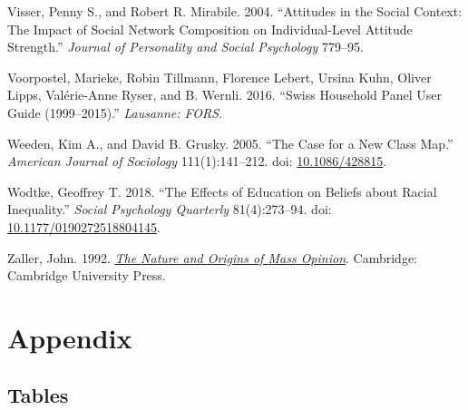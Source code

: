 \documentclass[
  11pt,
]{article}
\newlength{\cslhangindent}
\newlength{\cslentryspacingunit} %
\newenvironment{CSLReferences}[2] %
 {%
  \setlength{\parindent}{0pt}
  \ifodd #1
  \let\oldpar\par
  \def\par{\hangindent=\cslhangindent\oldpar}
  \fi
  \setlength{\parskip}{#2\cslentryspacingunit}
 }%
 {}
\begin{document}
\begin{CSLReferences}{1}{0}
\leavevmode{}%
Visser, Penny S., and Robert R. Mirabile. 2004. {``Attitudes in the
Social Context: {The} Impact of Social Network Composition on
Individual-Level Attitude Strength.''} \emph{Journal of Personality and
Social Psychology} 779--95.

\leavevmode{}%
Voorpostel, Marieke, Robin Tillmann, Florence Lebert, Ursina Kuhn,
Oliver Lipps, Valérie-Anne Ryser, and B. Wernli. 2016. {``Swiss
Household Panel User Guide (1999--2015).''} \emph{Lausanne: FORS}.

\leavevmode{}%
Weeden, Kim A., and David B. Grusky. 2005. {``The {Case} for a {New}
{Class} {Map}.''} \emph{American Journal of Sociology} 111(1):141--212.
doi: \href{https://doi.org/10.1086/428815}{10.1086/428815}.

\leavevmode{}%
Wodtke, Geoffrey T. 2018. {``The {Effects} of {Education} on {Beliefs}
about {Racial} {Inequality}.''} \emph{Social Psychology Quarterly}
81(4):273--94. doi:
\href{https://doi.org/10.1177/0190272518804145}{10.1177/0190272518804145}.

\leavevmode{}%
Zaller, John. 1992.
\emph{\href{https://doi.org/10.1017/CBO9780511818691}{The {Nature} and
{Origins} of {Mass} {Opinion}}}. Cambridge: Cambridge University Press.

\end{CSLReferences}

\newpage

\hypertarget{appendix}{%
\section{Appendix}\label{appendix}}

\hypertarget{tables}{%
\subsection{Tables}\label{tables}}
\end{document}
